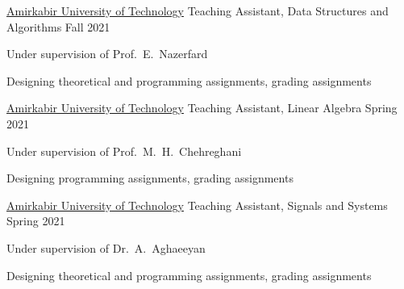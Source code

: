 \begin{cventries}
  \cventry
    {\href{https://aut.ac.ir/}{Amirkabir University of Technology}} %
    {Teaching Assistant, Data Structures and Algorithms} %
    {} %
    {Fall 2021} %
    {
      \begin{cvitems} %
        \item {Under supervision of Prof.~E.~Nazerfard}
        \item {Designing theoretical and programming assignments, grading assignments}
      \end{cvitems}
    }

  \cventry
    {\href{https://aut.ac.ir/}{Amirkabir University of Technology}} %
    {Teaching Assistant, Linear Algebra} %
    {} %
    {Spring 2021} %
    {
      \begin{cvitems} %
        \item {Under supervision of Prof.~M.~H.~Chehreghani}
        \item {Designing programming assignments, grading assignments}
      \end{cvitems}
    }

  \cventry
    {\href{https://aut.ac.ir/}{Amirkabir University of Technology}} %
    {Teaching Assistant, Signals and Systems} %
    {} %
    {Spring 2021} %
    {
      \begin{cvitems} %
        \item {Under supervision of Dr.~A.~Aghaeeyan}
        \item {Designing theoretical and programming assignments, grading assignments}
      \end{cvitems}
    }

\end{cventries}
